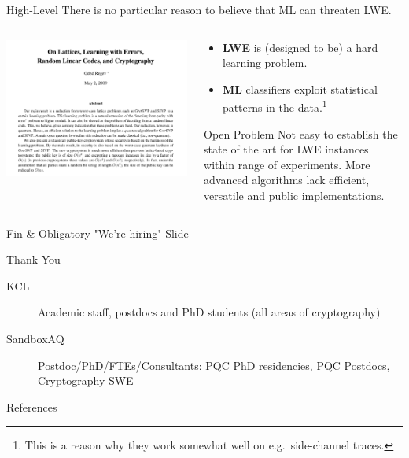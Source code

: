 \documentclass[table,10pt,aspectratio=169]{beamer}
\begin{document}
\begin{frame}[label={sec:org733f445}]{High-Level}
There is no particular reason to believe that ML can threaten LWE.

\begin{columns}
\begin{column}{0.6\columnwidth}
\begin{center}
\includegraphics[width=.9\linewidth]{./regev-hard-learning-problems.png}
\end{center}
\end{column}


\begin{column}{0.4\columnwidth}
\begin{itemize}
\item \textbf{LWE} is (designed to be) a hard learning problem.
\item \textbf{ML} classifiers exploit statistical patterns in the data.\footnote{This is a reason why they work somewhat well on e.g. side-channel traces.}
\end{itemize}

\begin{alertblock}{Open Problem}
Not easy to establish the state of the art for LWE instances within range of experiments. More advanced algorithms lack efficient, versatile and public implementations.
\end{alertblock}
\end{column}
\end{columns}
\end{frame}

\begin{frame}[label={sec:orga1c0879},standout]{Fin \& Obligatory "We're hiring" Slide}
\begin{center}
\Huge \alert{Thank You}
\end{center}

\begin{description}
\item[{KCL}] Academic staff, postdocs and PhD students (all areas of cryptography)
\item[{SandboxAQ}] Postdoc/PhD/FTEs/Consultants: PQC PhD residencies, PQC Postdocs, Cryptography SWE
\end{description}
\end{frame}

\begin{frame}[allowframebreaks]{References}
\renewcommand*{\bibfont}{\scriptsize}
\printbibliography[heading=none]
\end{frame}
\end{document}
